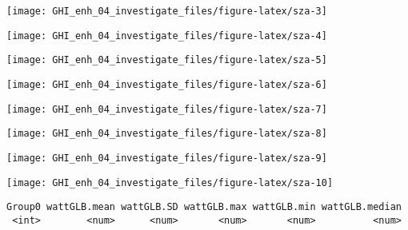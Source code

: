 \documentclass[
  10pt,
  a4paper,oneside]{article}
\begin{document}
\begin{center}\texttt{[image: GHI\_enh\_04\_investigate\_files/figure-latex/sza-3]} \end{center}

\begin{center}\texttt{[image: GHI\_enh\_04\_investigate\_files/figure-latex/sza-4]} \end{center}

\begin{center}\texttt{[image: GHI\_enh\_04\_investigate\_files/figure-latex/sza-5]} \end{center}

\begin{center}\texttt{[image: GHI\_enh\_04\_investigate\_files/figure-latex/sza-6]} \end{center}

\begin{center}\texttt{[image: GHI\_enh\_04\_investigate\_files/figure-latex/sza-7]} \end{center}

\begin{center}\texttt{[image: GHI\_enh\_04\_investigate\_files/figure-latex/sza-8]} \end{center}

\begin{center}\texttt{[image: GHI\_enh\_04\_investigate\_files/figure-latex/sza-9]} \end{center}

\begin{center}\texttt{[image: GHI\_enh\_04\_investigate\_files/figure-latex/sza-10]} \end{center}

\begin{verbatim}
Group0 wattGLB.mean wattGLB.SD wattGLB.max wattGLB.min wattGLB.median
 <int>        <num>      <num>       <num>       <num>          <num>
\end{verbatim}
\end{document}
